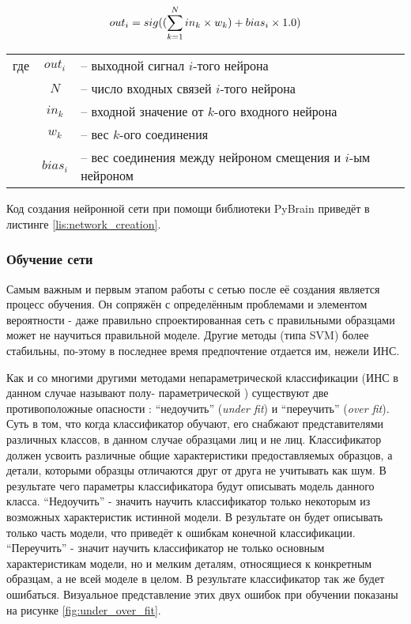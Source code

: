 \documentclass[12pt]{report}
\begin{document}
\begin{equation}
\label{eq:bias_calc}
\centering
out_i=sig((\sum_{k=1}^{N}{in_k \times w_k}) + bias_i \times 1.0)
\end{equation}

\begin{tabular}{p{3cm} c l}
где & $out_i$ & -- выходной сигнал $i$-того нейрона\\
	& $N$ & -- число входных связей $i$-того нейрона\\
	& $in_k$ & -- входной значение от $k$-ого входного нейрона\\
	& $w_k$ & -- вес $k$-ого соединения\\
	& $bias_i$ & -- вес соединения между нейроном смещения и $i$-ым нейроном\\
\end{tabular}

Код создания нейронной сети при помощи библиотеки PyBrain приведёт в листинге \ref{lis:network_creation}. 
\lstset{caption=Создание сети со скрытым слоем и без него.,
label=lis:network_creation,
basicstyle=\footnotesize\ttfamily,
captionpos=b,
breaklines=true,
breakatwhitespace=false,
numbers=left,
numbersep=5pt,
language=Python,
}



\subsubsection{Обучение сети}
Самым важным и первым этапом работы с сетью после её создания является процесс обучения. Он сопряжён с определённым 
проблемами и элементом вероятности - даже правильно спроектированная сеть с правильными образцами может не 
научиться 
правильной моделе. Другие методы (типа SVM) более стабильны, по-этому в последнее время предпочтение отдается им, 
нежели ИНС.

Как и со многими другими методами непараметрической классификации (ИНС в данном случае называют полу-
параметрической 
\citep{xu2006color}) существуют две противоположные опасности %
: ``недоучить'' (\textit{under fit}) и ``переучить'' (\textit{over fit}). Суть в том, что когда классификатор 
обучают, его снабжают представителями различных классов, в данном случае образцами лиц и не лиц. Классификатор 
должен 
усвоить различные общие характеристики предоставляемых образцов, а детали, которыми образцы отличаются друг от 
друга 
не учитывать как шум. В результате чего параметры классификатора будут описывать модель данного класса. ``Недоучить'' - значить научить классификатор только некоторым из возможных характеристик истинной модели. В результате 
он будет описывать только часть модели, что приведёт к ошибкам конечной классификации. ``Переучить'' - значит 
научить 
классификатор не только основным характеристикам модели, но и мелким деталям, относящиеся к конкретным образцам, а 
не 
всей моделе в целом. В результате классификатор так же будет ошибаться. \citep{bradski2008learning} Визуальное 
представление этих двух ошибок при обучении показаны на рисунке \ref{fig:under_over_fit}.
\end{document}
